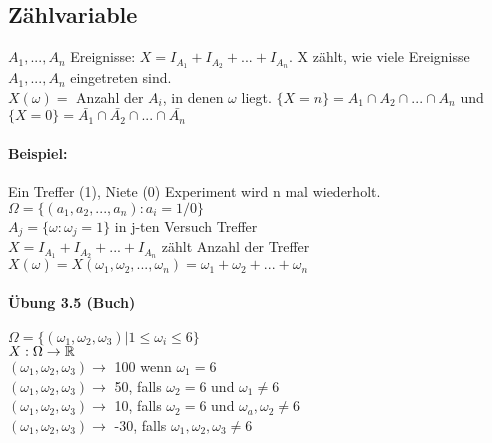 \subsection{Zählvariable}

$ A_1, ..., A_n $ Ereignisse: $ X=I_{A_1} + I_{A_2} + ... + I_{A_n} $. X zählt, wie viele Ereignisse $A_1, ..., A_n$ eingetreten sind. \\
$ X(\omega) = $ Anzahl der $A_i$, in denen $\omega$ liegt. $ \{X=n\} = A_1\cap A_2\cap ...\cap A_n$ und $ \{X=0\} = \bar{A_1} \cap \bar{A_2} \cap ... \cap \bar{A_n} $

\paragraph{Beispiel:} Ein Treffer (1), Niete (0) Experiment wird n mal wiederholt. \\
$ \Omega=\{(a_1,a_2,...,a_n) : a_i=1/0 \} $\\
$ A_j = \{\omega : \omega_j=1\} $ in j-ten Versuch Treffer\\
$ X=I_{A_1} + I_{A_2} + ... + I_{A_n} $ zählt Anzahl der Treffer\\
$ X(\omega) = X(\omega_1, \omega_2, ..., \omega_n) = \omega_1 + \omega_2 + ... + \omega_n $

\paragraph{Übung 3.5 (Buch)}
$ \Omega = \{ ( \omega_1, \omega_2, \omega_3 ) | 1 \leq \omega_i \leq 6 \} $\\
$ X: \Omega \rightarrow \mathbb{R} $\\
$ (\omega_1, \omega_2, \omega_3) \rightarrow $ 100 wenn $\omega_1=6$\\
$ (\omega_1, \omega_2, \omega_3) \rightarrow $ 50, falls $\omega_2=6$ und $\omega_1 \neq 6$\\
$ (\omega_1, \omega_2, \omega_3) \rightarrow $ 10, falls $\omega_2 = 6$ und $\omega_a, \omega_2\neq 6$\\
$ (\omega_1, \omega_2, \omega_3) \rightarrow $ -30, falls $\omega_1, \omega_2, \omega_3\neq 6$\\
